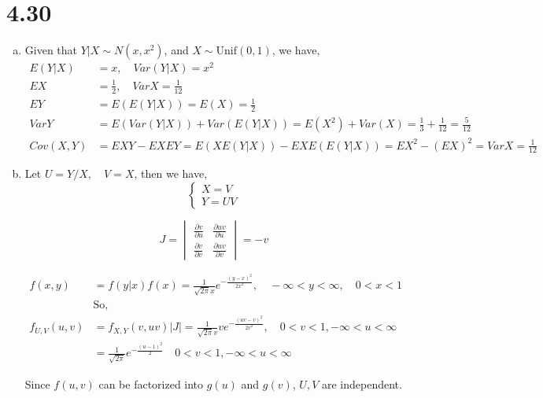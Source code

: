 \documentclass[letterpaper]{article}
\begin{document}
    \section*{4.30}
    	\begin{enumerate}[(a)]
    	\item Given that $Y|X \sim N(x, x^2)$, and $X \sim \text{Unif}(0,1)$, we have,
    	\begin{align*}
    	E(Y|X) & = x, \quad Var (Y|X) = x^2 \\
    	EX & = \frac{1}{2}, \quad Var X = \frac{1}{12} \\
    	EY & = E(E(Y|X)) = E(X) = \frac{1}{2} \\
    	Var Y & = E(Var(Y|X)) + Var(E(Y|X)) = E(X^2) + Var(X) = \frac{1}{3} + \frac{1}{12} = \frac{5}{12} \\
    	Cov(X, Y) & = EXY - EXEY = E(XE(Y|X)) - EXE(E(Y|X)) = EX^2 - (EX)^2 = Var X = \frac{1}{12}
    	\end{align*}
    	\item Let $U= Y/X, \quad V=X$, then we have,
    	\[
    	\begin{cases}
    	X = V \\
    	Y = UV
    	\end{cases}
    	\]
    	
    	\[ J = \begin{vmatrix}
    	\frac{\partial v}{\partial u} & \frac{\partial uv}{\partial u} \\
    	\frac{\partial v}{\partial v} & \frac{\partial uv}{\partial v}
    	\end{vmatrix} = -v
    	\]
    	
    	\begin{align*}
    	f(x, y) & = f(y|x) f(x) = \frac{1}{\sqrt{2\pi} x} e^{-\frac{(y-x)^2}{2x^2}}, \quad -\infty < y < \infty, \quad 0 < x < 1 \\
    	& \text{So, } \\
    	f_{U, V}(u, v) & = f_{X, Y}(v, uv) |J| = \frac{1}{\sqrt{2\pi} v} v e^{-\frac{(uv-v)^2}{2v^2}}, \quad 0 < v < 1, -\infty < u < \infty \\
    	& = \frac{1}{\sqrt{2\pi}} e^{-\frac{(u-1)^2}{2}} \quad 0 < v < 1, -\infty < u < \infty 
    	\end{align*}
    	
    	Since $f(u, v)$ can be factorized into $g(u)$ and $g(v)$, $U, V$ are independent.
	\end{enumerate}	
\end{document}
